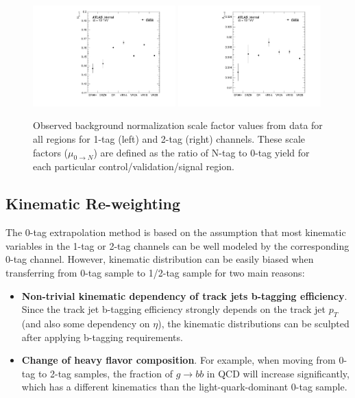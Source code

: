 \begin{figure}[htbp!]
\begin{center}
    \includegraphics[width=0.49\textwidth]{VHqqbb_PlotRegionMuSF_1tag.pdf}
    \includegraphics[width=0.49\textwidth]{VHqqbb_PlotRegionMuSF_2tag.pdf}
\end{center}
\caption{Observed background normalization scale factor values from data for all regions for 1-tag (left) and 2-tag (right) channels.
    These scale factors ($\mu_{0 \rightarrow N}$) are defined as the ratio of N-tag to 0-tag yield for each particular control/validation/signal region.
}
\label{fig:CompareMu}
\end{figure}

\subsection{Kinematic Re-weighting}
\label{sec:bkg-reweighting}
The 0-tag extrapolation method is based on the assumption that most kinematic variables in the 1-tag or 2-tag channels can be well modeled by the corresponding 0-tag channel.
However, kinematic distribution can be easily biased when transferring from 0-tag sample to 1/2-tag sample for two main reasons:

\begin{itemize}
    \item \textbf{Non-trivial kinematic dependency of track jets b-tagging efficiency}. Since the track jet b-tagging efficiency strongly depends on the track jet $p_{T}$ (and also some dependency on $\eta$), the kinematic distributions can be sculpted after applying b-tagging requirements.
    \item \textbf{Change of heavy flavor composition}. For example, when moving from 0-tag to 2-tag samples, the fraction of $g\rightarrow bb$ in QCD will increase significantly, which has a different kinematics than the light-quark-dominant 0-tag sample. 
\end{itemize}

